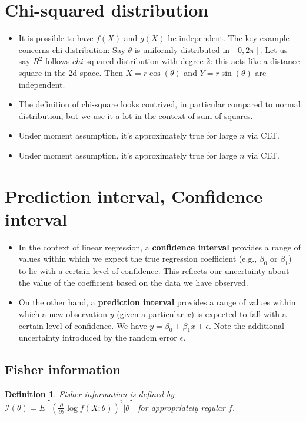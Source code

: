 \documentclass[11pt,reqno]{amsart}
\newtheorem{definition}{Definition}
\theoremstyle{remark}
\begin{document}
\section*{Chi-squared distribution}
\begin{itemize}
\item It is possible to have $f(X)$ and $g(X)$ be independent. The key example concerns chi-distribution: Say $\theta$ is uniformly distributed in $[0,2\pi]$. 
Let us say $R^2$ follows $chi$-squared distribution with degree 2: this acts like a distance square in the 2d space. Then $X= r\cos(\theta)$ and $Y=r\sin(\theta)$ are independent.
\item The definition of chi-square looks contrived, in particular compared to normal distribution, but we use it a lot in the context of sum of squares.
\item Under moment assumption, it's approximately true for large $n$ via CLT.
\item Under moment assumption, it's approximately true for large $n$ via CLT.
\end{itemize}


\section*{Prediction interval, Confidence interval}
\begin{itemize}
\item In the context of linear regression, a \textbf{confidence interval} provides a range of values within which we expect the true regression coefficient (e.g., $ \beta_0 $ or $ \beta_1 $) to lie with a certain level of confidence. This reflects our uncertainty about the 
value of the coefficient based on the data we have observed.
\item On the other hand, a \textbf{prediction interval} provides a range of values within which a new observation $ y $ (given a particular $ x $) is expected to fall with a certain level of confidence.
 We have $y=\beta_0+\beta_1 x+\epsilon$. Note the additional uncertainty introduced by the random error $\epsilon$.
\end{itemize}

\subsection*{Fisher information}
\begin{definition}
Fisher information is defined by $\mathcal{I}(\theta)=E[(\frac \partial{\partial\theta}\log f(X;\theta))^2|\theta]$ for appropriately regular $f$.
\end{definition}
\end{document}
